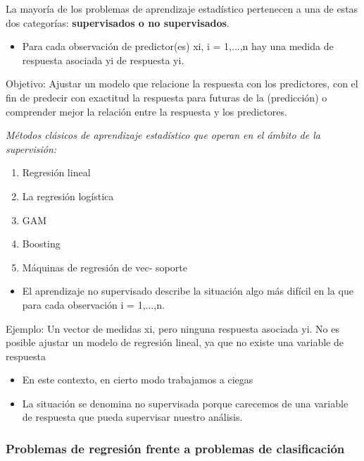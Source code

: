 \documentclass[
  letterpaper,
  DIV=11,
  numbers=noendperiod]{scrartcl}
\providecommand{\tightlist}{%
  \setlength{\itemsep}{0pt}\setlength{\parskip}{0pt}}\usepackage{longtable,booktabs,array}
\begin{document}
La mayoría de los problemas de aprendizaje estadístico pertenecen a una
de estas dos categorías: \textbf{supervisados o no supervisados}.

\begin{itemize}
\tightlist
\item
  Para cada observación de predictor(es) xi, i = 1,...,n hay una medida
  de respuesta asociada yi de respuesta yi.
\end{itemize}

Objetivo: Ajustar un modelo que relacione la respuesta con los
predictores, con el fin de predecir con exactitud la respuesta para
futuras de la (predicción) o comprender mejor la relación entre la
respuesta y los predictores.

\emph{Métodos clásicos de aprendizaje estadístico que operan en el
ámbito de la supervisión:}

\begin{enumerate}
\def\labelenumi{\arabic{enumi}.}
\item
  Regresión lineal
\item
  La regresión logística
\item
  GAM
\item
  Boosting
\item
  Máquinas de regresión de vec- soporte
\end{enumerate}

\begin{itemize}
\tightlist
\item
  El aprendizaje no supervisado describe la situación algo más difícil
  en la que para cada observación i = 1,...,n.
\end{itemize}

Ejemplo: Un vector de medidas xi, pero ninguna respuesta asociada yi. No
es posible ajustar un modelo de regresión lineal, ya que no existe una
variable de respuesta

\begin{itemize}
\item
  En este contexto, en cierto modo trabajamos a ciegas
\item
  La situación se denomina no supervisada porque carecemos de una
  variable de respuesta que pueda supervisar nuestro análisis.
\end{itemize}

\hypertarget{problemas-de-regresiuxf3n-frente-a-problemas-de-clasificaciuxf3n}{%
\subsubsection{\texorpdfstring{\textbf{Problemas de regresión frente a
problemas de
clasificación}}{Problemas de regresión frente a problemas de clasificación}}\label{problemas-de-regresiuxf3n-frente-a-problemas-de-clasificaciuxf3n}}
\end{document}
